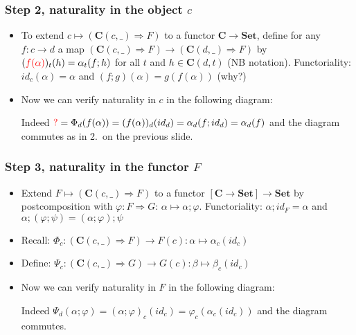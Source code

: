 \documentclass[handout]{beamer}
\newcommand{\To}{\Rightarrow}
\newcommand{\bfsf}[1]{{\boldsymbol{#1}}}
\newcommand{\Set}{\bfsf{Set}}
\newcommand{\CC}{\bfsf{C}}
\begin{document}
\frame
  {   
    \frametitle{Step 2, naturality in the object $c$}\label{Yon:natural_in_c}

 \begin{itemize}[<+->]
\item To extend $c\mapsto(\CC(c,\_)\To F)$ to a functor $\CC\to\Set$, define
for any $f:c\to d$ a map $(\CC(c,\_)\To F)\to(\CC(d,\_)\To F)$ by
$({\color{red}f(\alpha)})_t (h) = \alpha_t(f;h)$ for all $t$ and $h\in\CC(d,t)$ 
(NB {\color{red}notation}).
Functoriality: $id_c(\alpha) = \alpha$ and $(f;g)(\alpha) = g(f(\alpha))$ (why?)
\item Now we can verify naturality in $c$ in the following diagram:

Indeed ${\color{red} ?}=\Phi_d(f(\alpha)) = (f(\alpha))_d(id_d) = \alpha_d(f;id_d) = \alpha_d(f)$
and the diagram commutes as in 2.\ on the previous slide.
 \end{itemize}

 }

\frame
  {   
    \frametitle{Step 3, naturality in the functor $F$}\label{Yon:natural_in_F}

 \begin{itemize}[<+->]
\item Extend $F\mapsto(\CC(c,\_)\To F)$ to a functor $[\CC\to\Set]\to\Set$
by postcomposition with $\varphi:F\To G$: 
$\alpha \mapsto \alpha;\varphi$. %
Functoriality: 
$\alpha;id_F = \alpha$ and $\alpha;(\varphi;\psi) = (\alpha;\varphi);\psi$
\item Recall: $\Phi_c : (\CC(c,\_)\To F) \to F(c): \alpha\mapsto \alpha_c(id_c)$
\item Define: $\Psi_c : (\CC(c,\_)\To G) \to G(c): \beta\mapsto \beta_c(id_c)$
\item Now we can verify naturality in $F$ in the following diagram:

Indeed $\Psi_d(\alpha;\varphi) = (\alpha;\varphi)_c(id_c) = \varphi_c(\alpha_c(id_c))$
and the diagram commutes.
 \end{itemize}

 }
\end{document}
